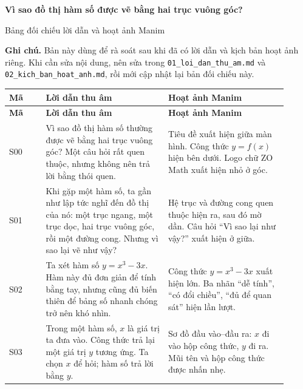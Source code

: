 \documentclass[11pt,a4paper]{article}
\begin{document}
{\Huge\bfseries Vì sao đồ thị hàm số được vẽ bằng hai trục vuông góc?}

\vspace{0.3em}

{\Large Bảng đối chiếu lời dẫn và hoạt ảnh Manim}

\vspace{1em}

\textbf{Ghi chú.} Bản này dùng để rà soát sau khi đã có lời dẫn và kịch bản hoạt ảnh riêng. Khi cần sửa nội dung, nên sửa trong \texttt{01\_loi\_dan\_thu\_am.md} và \texttt{02\_kich\_ban\_hoat\_anh.md}, rồi mới cập nhật lại bản đối chiếu này.

\vspace{1em}

\begin{longtable}{|L{0.12\linewidth}|L{0.40\linewidth}|L{0.39\linewidth}|}
\hline
\textbf{Mã} & \textbf{Lời dẫn thu âm} & \textbf{Hoạt ảnh Manim}\\
\hline
\endfirsthead

\hline
\textbf{Mã} & \textbf{Lời dẫn thu âm} & \textbf{Hoạt ảnh Manim}\\
\hline
\endhead

S00 &
Vì sao đồ thị hàm số thường được vẽ bằng hai trục vuông góc? Một câu hỏi rất quen thuộc, nhưng không nên trả lời bằng thói quen. &
Tiêu đề xuất hiện giữa màn hình. Công thức \(y=f(x)\) hiện bên dưới. Logo chữ ZO Math xuất hiện nhỏ ở góc.\\
\hline

S01 &
Khi gặp một hàm số, ta gần như lập tức nghĩ đến đồ thị của nó: một trục ngang, một trục dọc, hai trục vuông góc, rồi một đường cong. Nhưng vì sao lại vẽ như vậy? &
Hệ trục và đường cong quen thuộc hiện ra, sau đó mờ dần. Câu hỏi “Vì sao lại như vậy?” xuất hiện ở giữa.\\
\hline

S02 &
Ta xét hàm số \(y=x^3-3x\). Hàm này đủ đơn giản để tính bằng tay, nhưng cũng đủ biến thiên để bảng số nhanh chóng trở nên khó nhìn. &
Công thức \(y=x^3-3x\) xuất hiện lớn. Ba nhãn “dễ tính”, “có đổi chiều”, “đủ để quan sát” hiện lần lượt.\\
\hline

S03 &
Trong một hàm số, \(x\) là giá trị ta đưa vào. Công thức trả lại một giá trị \(y\) tương ứng. Ta chọn \(x\) để hỏi; hàm số trả lời bằng \(y\). &
Sơ đồ đầu vào--đầu ra: \(x\) đi vào hộp công thức, \(y\) đi ra. Mũi tên và hộp công thức được nhấn nhẹ.\\
\hline


\end{longtable}
\end{document}
